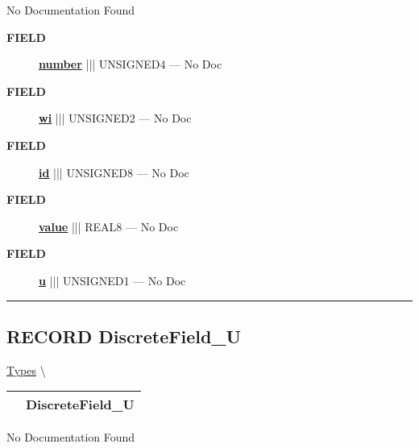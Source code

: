 \par





No Documentation Found







\par
\begin{description}
\item [\colorbox{tagtype}{\color{white} \textbf{\textsf{FIELD}}}] \textbf{\underline{number}} ||| UNSIGNED4 --- No Doc
\item [\colorbox{tagtype}{\color{white} \textbf{\textsf{FIELD}}}] \textbf{\underline{wi}} ||| UNSIGNED2 --- No Doc
\item [\colorbox{tagtype}{\color{white} \textbf{\textsf{FIELD}}}] \textbf{\underline{id}} ||| UNSIGNED8 --- No Doc
\item [\colorbox{tagtype}{\color{white} \textbf{\textsf{FIELD}}}] \textbf{\underline{value}} ||| REAL8 --- No Doc
\item [\colorbox{tagtype}{\color{white} \textbf{\textsf{FIELD}}}] \textbf{\underline{u}} ||| UNSIGNED1 --- No Doc
\end{description}





\rule{\linewidth}{0.5pt}
\subsection*{\textsf{\colorbox{headtoc}{\color{white} RECORD}
DiscreteField\_U}}

\hypertarget{ecldoc:logisticregression.types.discretefield_u}{}
\hspace{0pt} \hyperlink{ecldoc:LogisticRegression.Types}{Types} \textbackslash 

{\renewcommand{\arraystretch}{1.5}
\begin{tabularx}{\textwidth}{|>{\raggedright\arraybackslash}l|X|}
\hline
\hspace{0pt}\mytexttt{\color{red} } & \textbf{DiscreteField\_U} \\
\hline
\end{tabularx}
}

\par





No Documentation Found







